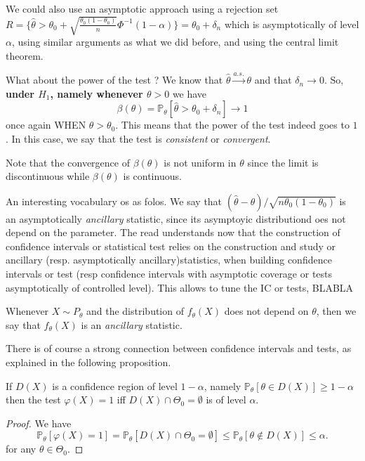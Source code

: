\documentclass[
	fontsize=11pt, %
	twoside=false, %
	numbers=noenddot, %
]{kaobook}
\renewcommand{\P}{\mathbb P}
\newcommand{\wh}{\widehat}
\newcommand{\go}{\rightarrow}
\newcommand{\goas}{\overset{a.s.}{\rightarrow}}
\begin{document}
We could also use an asymptotic approach using a rejection set $R = \{ \wh \theta > \theta_0  + \sqrt{\frac{\theta_0 (1 - \theta_0)}{n}} \Phi^{-1}(1 - \alpha) \} = \theta_0 + \delta_n$ which is asymptotically of level $\alpha$, using similar arguments as what we did before, and using the central limit theorem.

What about the power of the test ?
We know that $\wh \theta \goas \theta$ and that $\delta_n \go 0$.
So, \textbf{under $H_1$, namely whenever $\theta > 0$} we have
\begin{equation*}
	\beta(\theta) = \P_\theta[ \wh \theta > \theta_0 + \delta_n] \go 1
\end{equation*}
once again WHEN $\theta > \theta_0$.
This means that the power of the test indeed goes to $1$.
In this case, we say that the test is \emph{consistent} or \emph{convergent}.

\begin{remark}
 	Note that the convergence of $\beta(\theta)$ is not uniform in $\theta$ since the limit is discontinuous while $\beta(\theta)$ is continuous.
\end{remark}

An interesting vocabulary os as folos.
We say that $(\wh \theta - \theta) / \sqrt{n \theta_0(1 - \theta_0)}$ is an asymptotically \emph{ancillary} statistic, since its asymptoyic distributiond oes not depend on the parameter.
The read understands now that the construction of confidence intervals or statistical test relies on the construction and study or ancillary (resp. asymptotically ancillary)statistics, when building confidence intervals or test (resp confidence intervals with asymptotic coverage or tests asymptotically of controlled level).
This allows to tune the IC or tests, BLABLA

Whenever $X \sim P_\theta$ and the distribution of $f_\theta(X)$ does not depend on $\theta$, then we say that $f_\theta(X)$ is an \emph{ancillary} statistic.


There is of course a strong connection between confidence intervals and tests, as explained in the following proposition.
\begin{proposition}
	If $D(X)$ is a confidence region of level $1 - \alpha$, namely $\P_\theta[ \theta \in D(X)] \geq 1 - \alpha$ then the test $\varphi(X) = 1$ iff $D(X) \cap \Theta_0  = \emptyset$ is of level $\alpha$.
\end{proposition}
\begin{proof}
	We have
	\begin{equation*}
		\P_\theta [\varphi(X) = 1] = \P_\theta[ D(X) \cap \Theta_0 = \emptyset] \leq \P_\theta[ \theta \notin D(X) ] \leq \alpha.
	\end{equation*}
	for any $\theta \in \Theta_0$.
\end{proof}
\end{document}

